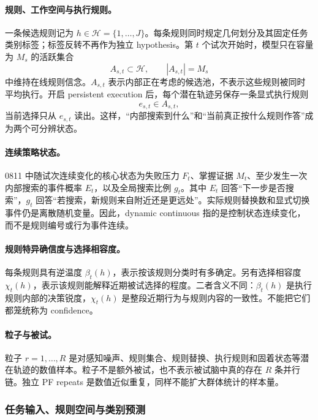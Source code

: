 \paragraph{规则、工作空间与执行规则。}
一条候选规则记为 $h\in\mathcal H=\{1,\ldots,J\}$。每条规则同时规定几何划分及其固定任务类别标签；标签反转不再作为独立 hypothesis。第 $t$ 个试次开始时，模型只在容量为 $M_s$ 的活跃集合
\begin{equation}
A_{s,t}\subset\mathcal H,
\qquad |A_{s,t}|=M_s
\label{eq:model0811-active-set}
\end{equation}
中维持在线规则信念。$A_{s,t}$ 表示内部正在考虑的候选池，不表示这些规则被同时平均执行。开启 persistent execution 后，每个潜在轨迹另保存一条显式执行规则
\begin{equation}
e_{s,t}\in A_{s,t},
\label{eq:model0811-executed-rule}
\end{equation}
当前选择只从 $e_{s,t}$ 读出。这样，“内部搜索到什么”和“当前真正按什么规则作答”成为两个可分辨状态。

\paragraph{连续策略状态。}
0811 中随试次连续变化的核心状态为失败压力 $F_t$、掌握证据 $M_t$、至少发生一次内部搜索的事件概率 $E_t$，以及全局搜索比例 $g_t$。其中 $E_t$ 回答“下一步是否搜索”，$g_t$ 回答“若搜索，新规则来自附近还是更远处”。实际规则替换数和显式切换事件仍是离散随机变量。因此，dynamic continuous 指的是控制状态连续变化，而不是规则编号或行为事件连续。

\paragraph{规则特异确信度与选择相容度。}
每条规则具有逆温度 $\beta_t(h)$，表示按该规则分类时有多确定。另有选择相容度 $\chi_t(h)$，表示该规则能解释近期被试选择的程度。二者含义不同：$\beta_t(h)$ 是执行规则内部的决策锐度，$\chi_t(h)$ 是整段近期行为与规则内容的一致性。不能把它们都笼统称为 confidence。

\paragraph{粒子与被试。}
粒子 $r=1,\ldots,R$ 是对感知噪声、规则集合、规则替换、执行规则和固着状态等潜在轨迹的数值样本。粒子不是额外被试，也不表示被试脑中真的存在 $R$ 条并行链。独立 PF repeats 是数值近似重复，同样不能扩大群体统计的样本量。


\subsubsection{任务输入、规则空间与类别预测}

